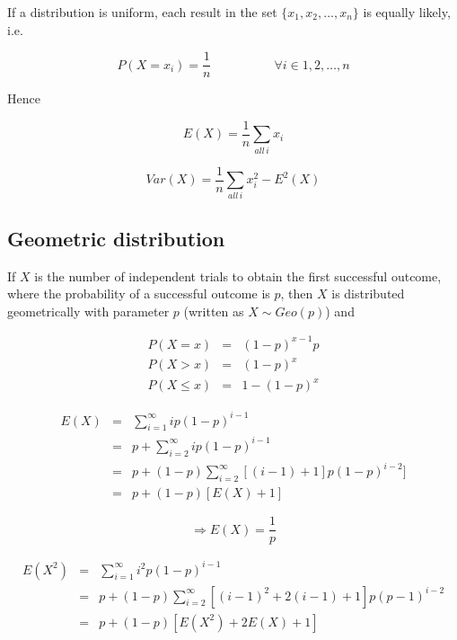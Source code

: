 \documentclass[a5paper]{article}
\begin{document}
If a distribution is uniform, each result in the set $\{x_1, x_2, \ldots, x_n\}$ is
equally likely, i.e.

\begin{equation}
  P(X\!=\!x_i) = \frac{1}{n} \hspace{5em}\forall i \in 1, 2, \ldots, n
\end{equation}

\noindent Hence

\begin{equation}
  E(X) = \frac{1}{n}\sum_{all\,i}x_i
\end{equation}

\begin{equation}
  Var(X) = \frac{1}{n}\sum_{all\,i}x_i^2 - E^2(X)
\end{equation}

\subsection{Geometric distribution}

If $X$ is the number of independent trials to obtain the first successful
outcome, where the probability of a successful outcome is $p$, then $X$ is
distributed geometrically with parameter $p$ (written as $X\sim Geo(p)$) and

\begin{eqnarray}
  P(X\!=\!x) &=& (1-p)^{x-1}p \\
  P(X\!>\!x) &=& (1-p)^x \\
  P(X\!\leq\!x) &=& 1 - (1-p)^x
\end{eqnarray}

\begin{eqnarray}
  E(X) &=& \sum_{i=1}^\infty ip(1-p)^{i-1} \nonumber\\
  &=& p + \sum_{i=2}^\infty ip(1-p)^{i-1} \nonumber\\
  &=& p + (1-p)\sum_{i=2}^\infty [(i-1) + 1]p(1-p)^{i-2}]\nonumber\\
  &=& p + (1-p)\left[E(X) + 1\right]\nonumber
\end{eqnarray}

\begin{equation}
  \Rightarrow E(X) = \frac{1}{p}
\end{equation}

\begin{eqnarray}
  E(X^2) &=& \sum_{i=1}^\infty i^2p(1-p)^{i-1} \nonumber\\
  &=& p + (1-p)\sum_{i=2}^\infty [(i-1)^2 +2(i-1) +1]p(p-1)^{i-2} \nonumber\\
  &=& p + (1-p)[E(X^2) + 2E(X) + 1]\nonumber
\end{eqnarray}
\end{document}
